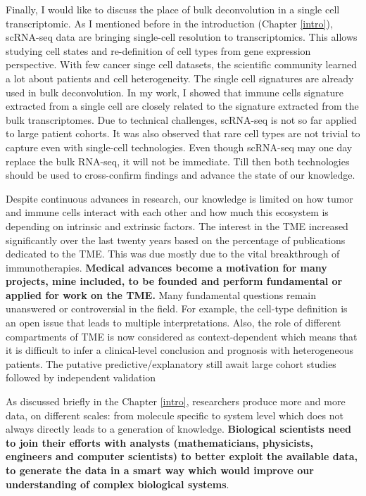 \documentclass[12pt,]{book}
\theoremstyle{definition}
\theoremstyle{definition}
\theoremstyle{definition}
\theoremstyle{remark}
\begin{document}
Finally, I would like to discuss the place of bulk deconvolution in a
single cell transcriptomic. As I mentioned before in the introduction
(Chapter \ref{intro}), scRNA-seq data are bringing single-cell
resolution to transcriptomics. This allows studying cell states and
re-definition of cell types from gene expression perspective. With few
cancer singe cell datasets, the scientific community learned a lot about
patients and cell heterogeneity. The single cell signatures are already
used in bulk deconvolution. In my work, I showed that immune cells
signature extracted from a single cell are closely related to the
signature extracted from the bulk transcriptomes. Due to technical
challenges, scRNA-seq is not so far applied to large patient cohorts. It
was also observed that rare cell types are not trivial to capture even
with single-cell technologies. Even though scRNA-seq may one day replace
the bulk RNA-seq, it will not be immediate. Till then both technologies
should be used to cross-confirm findings and advance the state of our
knowledge.

Despite continuous advances in research, our knowledge is limited on how
tumor and immune cells interact with each other and how much this
ecosystem is depending on intrinsic and extrinsic factors. The interest
in the TME increased significantly over the last twenty years based on
the percentage of publications dedicated to the TME. This was due mostly
due to the vital breakthrough of immunotherapies. \textbf{Medical
advances become a motivation for many projects, mine included, to be
founded and perform fundamental or applied for work on the TME. }Many
fundamental questions remain unanswered or controversial in the field.
For example, the cell-type definition is an open issue that leads to
multiple interpretations. Also, the role of different compartments of
TME is now considered as context-dependent which means that it is
difficult to infer a clinical-level conclusion and prognosis with
heterogeneous patients. The putative predictive/explanatory still await
large cohort studies followed by independent validation

As discussed briefly in the Chapter \ref{intro}, researchers produce
more and more data, on different scales: from molecule specific to
system level which does not always directly leads to a generation of
knowledge. \textbf{Biological scientists need to join their efforts with
analysts (mathematicians, physicists, engineers and computer scientists)
to better exploit the available data, to generate the data in a smart
way which would improve our understanding of complex biological
systems}.
\end{document}
